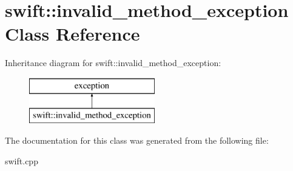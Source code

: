\hypertarget{classswift_1_1invalid__method__exception}{\section{swift\-:\-:invalid\-\_\-method\-\_\-exception Class Reference}
\label{classswift_1_1invalid__method__exception}
}
Inheritance diagram for swift\-:\-:invalid\-\_\-method\-\_\-exception\-:\begin{figure}[H]
\begin{center}
\leavevmode
\includegraphics[height=2.000000cm]{classswift_1_1invalid__method__exception}
\end{center}
\end{figure}


The documentation for this class was generated from the following file\-:\begin{DoxyCompactItemize}
\item 
swift.\-cpp\end{DoxyCompactItemize}
